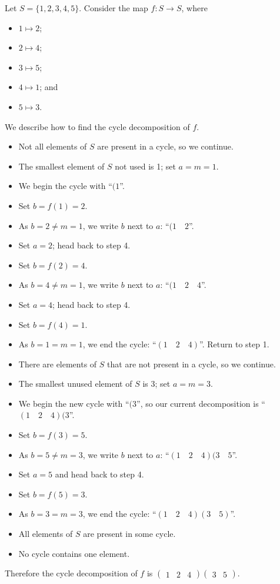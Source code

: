 \begin{example}
    Let $S = \{1,2,3,4,5\}$. Consider the map $f: S \to S$, where
    \begin{itemize}
        \item $1 \mapsto 2$;
        \item $2 \mapsto 4$;
        \item $3 \mapsto 5$;
        \item $4 \mapsto 1$; and
        \item $5 \mapsto 3$.
    \end{itemize}
    We describe how to find the cycle decomposition of $f$.
    \begin{itemize}
        \item Not all elements of $S$ are present in a cycle, so we continue.
        \item The smallest element of $S$ not used is 1; set $a = m = 1$.
        \item We begin the cycle with ``$(1$''.
        \item Set $b = f(1) = 2$.
        \item As $b = 2 \neq m = 1$, we write $b$ next to $a$: ``$(1\quad2$''.
        \item Set $a = 2$; head back to step 4.
        \item Set $b = f(2) = 4$.
        \item As $b = 4 \neq m = 1$, we write $b$ next to $a$: ``$(1\quad2\quad4$''.
        \item Set $a = 4$; head back to step 4.
        \item Set $b = f(4) = 1$.
        \item As $b = 1 = m = 1$, we end the cycle: ``$(1\quad2\quad4)$''. Return to step 1.
        \item There are elements of $S$ that are not present in a cycle, so we continue.
        \item The smallest unused element of $S$ is 3; set $a = m = 3$.
        \item We begin the new cycle with ``$(3$'', so our current decomposition is ``$(1\quad2\quad4)(3$''.
        \item Set $b = f(3) = 5$.
        \item As $b = 5 \neq m = 3$, we write $b$ next to $a$: ``$(1\quad2\quad4)(3\quad5$''.
        \item Set $a = 5$ and head back to step 4.
        \item Set $b = f(5) = 3$.
        \item As $b = 3 = m = 3$, we end the cycle: ``$(1\quad2\quad4)(3\quad5)$''.
        \item All elements of $S$ are present in some cycle.
        \item No cycle contains one element.
    \end{itemize}
    Therefore the cycle decomposition of $f$ is $\begin{pmatrix}1&2&4\end{pmatrix}\begin{pmatrix}3&5\end{pmatrix}$.
\end{example}



